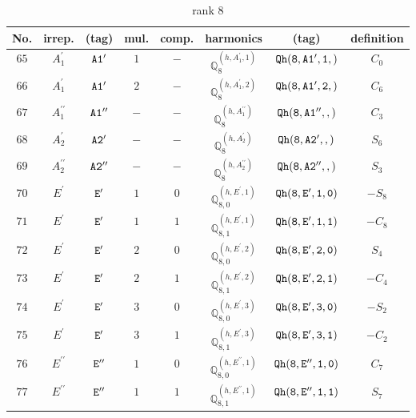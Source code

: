 \documentclass[fleqn,8pt]{jsarticle}
\begin{document}
\begin{table}[ht!]
\begin{center}
\caption{rank 8}
\renewcommand{\arraystretch}{1.3}
\begin{tabular}{cccccccc} \hline \hline
No. & irrep. & (tag) & mul. & comp. & harmonics & (tag) & definition \\ \hline
$ 65 $ & $ A_{1}^{\prime} $ & $ {\tt A1'} $ & $ 1 $ & $ - $ & $ \mathbb{Q}_{8}^{(h,A_{1}^{\prime},1)} $ & $ {\tt Qh(8,A1',1,)} $ & $ C_{0} $ \\
$ 66 $ & $ A_{1}^{\prime} $ & $ {\tt A1'} $ & $ 2 $ & $ - $ & $ \mathbb{Q}_{8}^{(h,A_{1}^{\prime},2)} $ & $ {\tt Qh(8,A1',2,)} $ & $ C_{6} $ \\
$ 67 $ & $ A_{1}^{\prime\prime} $ & $ {\tt A1''} $ & $ - $ & $ - $ & $ \mathbb{Q}_{8}^{(h,A_{1}^{\prime\prime})} $ & $ {\tt Qh(8,A1'',,)} $ & $ C_{3} $ \\
$ 68 $ & $ A_{2}^{\prime} $ & $ {\tt A2'} $ & $ - $ & $ - $ & $ \mathbb{Q}_{8}^{(h,A_{2}^{\prime})} $ & $ {\tt Qh(8,A2',,)} $ & $ S_{6} $ \\
$ 69 $ & $ A_{2}^{\prime\prime} $ & $ {\tt A2''} $ & $ - $ & $ - $ & $ \mathbb{Q}_{8}^{(h,A_{2}^{\prime\prime})} $ & $ {\tt Qh(8,A2'',,)} $ & $ S_{3} $ \\
$ 70 $ & $ E^{\prime} $ & $ {\tt E'} $ & $ 1 $ & $ 0 $ & $ \mathbb{Q}_{8,0}^{(h,E^{\prime},1)} $ & $ {\tt Qh(8,E',1,0)} $ & $ - S_{8} $ \\
$ 71 $ & $ E^{\prime} $ & $ {\tt E'} $ & $ 1 $ & $ 1 $ & $ \mathbb{Q}_{8,1}^{(h,E^{\prime},1)} $ & $ {\tt Qh(8,E',1,1)} $ & $ - C_{8} $ \\
$ 72 $ & $ E^{\prime} $ & $ {\tt E'} $ & $ 2 $ & $ 0 $ & $ \mathbb{Q}_{8,0}^{(h,E^{\prime},2)} $ & $ {\tt Qh(8,E',2,0)} $ & $ S_{4} $ \\
$ 73 $ & $ E^{\prime} $ & $ {\tt E'} $ & $ 2 $ & $ 1 $ & $ \mathbb{Q}_{8,1}^{(h,E^{\prime},2)} $ & $ {\tt Qh(8,E',2,1)} $ & $ - C_{4} $ \\
$ 74 $ & $ E^{\prime} $ & $ {\tt E'} $ & $ 3 $ & $ 0 $ & $ \mathbb{Q}_{8,0}^{(h,E^{\prime},3)} $ & $ {\tt Qh(8,E',3,0)} $ & $ - S_{2} $ \\
$ 75 $ & $ E^{\prime} $ & $ {\tt E'} $ & $ 3 $ & $ 1 $ & $ \mathbb{Q}_{8,1}^{(h,E^{\prime},3)} $ & $ {\tt Qh(8,E',3,1)} $ & $ - C_{2} $ \\
$ 76 $ & $ E^{\prime\prime} $ & $ {\tt E''} $ & $ 1 $ & $ 0 $ & $ \mathbb{Q}_{8,0}^{(h,E^{\prime\prime},1)} $ & $ {\tt Qh(8,E'',1,0)} $ & $ C_{7} $ \\
$ 77 $ & $ E^{\prime\prime} $ & $ {\tt E''} $ & $ 1 $ & $ 1 $ & $ \mathbb{Q}_{8,1}^{(h,E^{\prime\prime},1)} $ & $ {\tt Qh(8,E'',1,1)} $ & $ S_{7} $ \\

\end{tabular}
\end{center}
\end{table}
\end{document}
